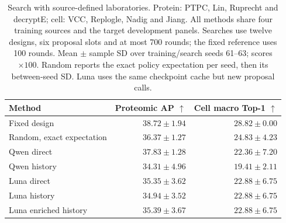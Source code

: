 \begin{table}[t]
\caption{Search with source-defined laboratories. Protein: PTPC, Lin, Ruprecht and decryptE; cell: VCC, Replogle, Nadig and Jiang. All methods share four training sources and the target development panels. Searches use twelve designs, six proposal slots and at most 700 rounds; the fixed reference uses 100 rounds. Mean $\pm$ sample SD over training/search seeds 61--63; scores $\times100$. Random reports the exact policy expectation per seed, then its between-seed SD. Luna uses the same checkpoint cache but new proposal calls.}
\label{tab:rebuttal-source-history}
\centering\small
\begin{tabular}{lrr}
\toprule
Method & Proteomic AP $\uparrow$ & Cell macro Top-1 $\uparrow$ \\
\midrule
Fixed design & $38.72\pm1.94$ & $28.82\pm0.00$ \\
Random, exact expectation & $36.37\pm1.27$ & $24.83\pm4.23$ \\
Qwen direct & $37.83\pm1.28$ & $22.36\pm7.20$ \\
Qwen history & $34.31\pm4.96$ & $19.41\pm2.11$ \\
Luna direct & $35.35\pm3.62$ & $22.88\pm6.75$ \\
Luna history & $34.94\pm3.52$ & $22.88\pm6.75$ \\
Luna enriched history & $35.39\pm3.67$ & $22.88\pm6.75$ \\
\bottomrule
\end{tabular}
\end{table}
